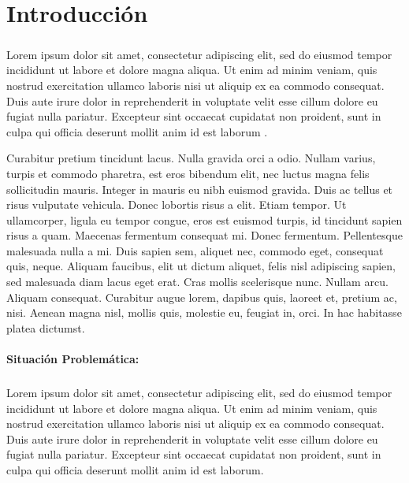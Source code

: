 
\chapter*{Introducción}

\paragraph{}Lorem ipsum dolor sit amet, consectetur adipiscing elit, sed do eiusmod tempor incididunt ut labore et dolore magna aliqua. Ut enim ad minim veniam, quis nostrud exercitation ullamco laboris nisi ut aliquip ex ea commodo consequat. Duis aute irure dolor in reprehenderit in voluptate velit esse cillum dolore eu fugiat nulla pariatur. Excepteur sint occaecat cupidatat non proident, sunt in culpa qui officia deserunt mollit anim id est laborum \cite{noauthor_something_2007}.

Curabitur pretium tincidunt lacus. Nulla gravida orci a odio. Nullam varius, turpis et commodo pharetra, est eros bibendum elit, nec luctus magna felis sollicitudin mauris. Integer in mauris eu nibh euismod gravida. Duis ac tellus et risus vulputate vehicula. Donec lobortis risus a elit. Etiam tempor. Ut ullamcorper, ligula eu tempor congue, eros est euismod turpis, id tincidunt sapien risus a quam. Maecenas fermentum consequat mi. Donec fermentum. Pellentesque malesuada nulla a mi. Duis sapien sem, aliquet nec, commodo eget, consequat quis, neque. Aliquam faucibus, elit ut dictum aliquet, felis nisl adipiscing sapien, sed malesuada diam lacus eget erat. Cras mollis scelerisque nunc. Nullam arcu. Aliquam consequat. Curabitur augue lorem, dapibus quis, laoreet et, pretium ac, nisi. Aenean magna nisl, mollis quis, molestie eu, feugiat in, orci. In hac habitasse platea dictumst.

\subsubsection*{Situación Problemática:}
\paragraph{}Lorem ipsum dolor sit amet, consectetur adipiscing elit, sed do eiusmod tempor incididunt ut labore et dolore magna aliqua. Ut enim ad minim veniam, quis nostrud exercitation ullamco laboris nisi ut aliquip ex ea commodo consequat. Duis aute irure dolor in reprehenderit in voluptate velit esse cillum dolore eu fugiat nulla pariatur. Excepteur sint occaecat cupidatat non proident, sunt in culpa qui officia deserunt mollit anim id est laborum.

